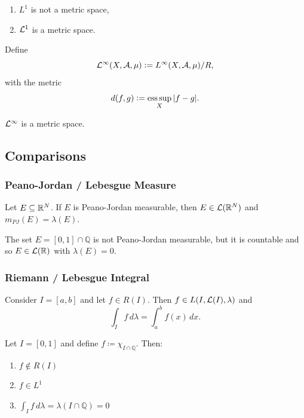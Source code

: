 \begin{remark}
\begin{enumerate}
    \item $L^1$ is not a metric space,
    \item $\mathcal{L}^1$ is a metric space.
\end{enumerate}
\end{remark}

Define
\[
\mathcal{L}^\infty(X, \mathcal{A}, \mu) \mathrel{\mathop:}= L^\infty(X, \mathcal{A}, \mu) / R,
\]
with the metric
\[
d(f, g) \mathrel{\mathop:}= \operatorname*{ess\,sup}_X |f - g|.
\]

\begin{lemma}
$\mathcal{L}^\infty$ is a metric space.
\end{lemma}

\clearpage
\subsection{Comparisons}
\subsubsection{Peano-Jordan / Lebesgue Measure}

\begin{theorem}
Let $E \subseteq \mathbb{R}^N$. If $E$ is Peano-Jordan measurable, then $E \in \mathcal{L}(\mathbb{R}^N)$ and $m_{PJ}(E) = \lambda(E)$.
\end{theorem}

\begin{example}
The set $E = [0,1] \cap \mathbb{Q}$ is not Peano-Jordan measurable, but it is countable and so $E \in \mathcal{L}(\mathbb{R})$ with $\lambda(E) = 0$.
\end{example}

\subsubsection{Riemann / Lebesgue Integral}

\begin{theorem}
Consider $I = [a,b]$ and let $f \in R(I)$. Then $f \in L(I, \mathcal{L}(I), \lambda)$ and 
\[
\int_I f \, d\lambda = \int_a^b f(x) \, dx.
\]
\end{theorem}

\begin{example}
Let $I = [0,1]$ and define $f \coloneqq \chi_{I \cap \mathbb{Q}}$. Then:
\begin{enumerate}
    \item $f \notin R(I)$
    \item $f \in L^1$
    \item $\int_I f \, d\lambda = \lambda(I \cap \mathbb{Q}) = 0$
\end{enumerate}
\end{example}

